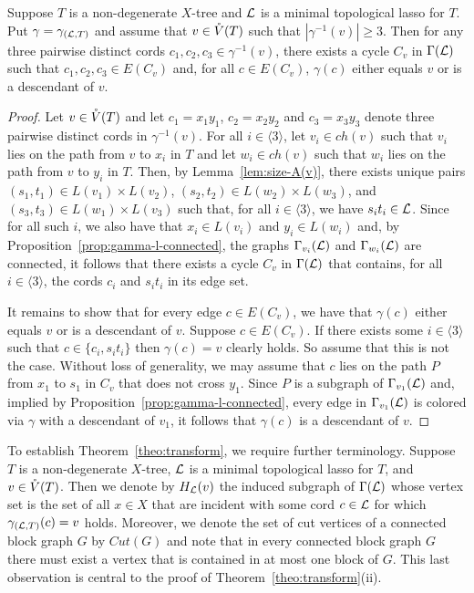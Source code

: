 \begin{lem}
  \label{lem:3-edges-cycle}
  Suppose $T$ is a non-degenerate $X$-tree and ${\mathcal L}$ is a minimal topological
  lasso for $T$.  Put $\gamma=\gamma_{({\mathcal L},T)}$ and assume that $v\in \mathring{V}(T)$
  such that $|\gamma^{-1}(v)|\geq 3 $. Then for any three pairwise distinct
  cords $c_1,c_2,c_3\in \gamma^{-1}(v)$, there exists a
  cycle $C_v$ in $\Gamma({\mathcal L})$ such that $c_1,c_2,c_3\in E(C_v)$ and, for all
  $c\in E(C_v)$, $\gamma(c)$ either equals $v$ or is a descendant of $v$.
\end{lem}
\begin{proof}
  Let $v\in \mathring{V}(T)$ and let $c_1=x_1y_1$, $c_2=x_2y_2$ and $c_3=x_3y_3$ denote
  three pairwise distinct cords in $\gamma^{-1}(v)$.  For all $i\in\langle
  3\rangle$, let $v_i\in ch(v) $ such that $v_i$ lies on the path from $v$ to
  $x_i$ in $T$ and let $w_i\in ch(v)$ such that $w_i$ lies on the path from
  $v$ to $y_i$ in $T$.  Then, by Lemma~\ref{lem:size-A(v)}, there exists
  unique pairs $(s_1,t_1)\in L(v_1)\times L(v_2)$, $(s_2,t_2)\in L(w_2)\times
  L(w_3)$, and $(s_3,t_3)\in L(w_1)\times L(v_3)$ such that, for all
  $i\in\langle 3\rangle$, we have $s_it_i\in {\mathcal L}$.  Since for all such $i$, we
  also have that $x_i\in L(v_i)$ and $y_i\in L(w_i)$ and, by
  Proposition~\ref{prop:gamma-l-connected}, the graphs $\Gamma_{v_i}({\mathcal L})$ and
  $\Gamma_{w_i}({\mathcal L})$ are connected, it follows that there exists a
  cycle $C_v$ in $\Gamma({\mathcal L})$ that contains, for all $i\in\langle 3\rangle$,
  the cords $c_i$ and $s_it_i$ in its edge set.

  It remains to show that for every edge $c\in E(C_v)$, we have that
  $\gamma(c)$ either equals $v$ or is a descendant of $v$.  Suppose $c\in
  E(C_v)$.  If there exists some $i\in\langle 3\rangle$ such that
  $c\in\{c_i,s_it_i\}$ then $\gamma (c)=v$ clearly holds. So assume that
  this is not the case. Without loss of generality, we may assume that $c$
  lies on the path $P$ from $x_1$ to $s_1$ in $C_v$ that does not cross
  $y_1$. Since $P$ is a subgraph of $\Gamma_{v_1}({\mathcal L})$ and, implied by
  Proposition~\ref{prop:gamma-l-connected}, every edge in $\Gamma_{v_1}({\mathcal L})$
  is colored via $\gamma$ with a descendant of $v_1$, it follows that
  $\gamma(c)$ is a descendant of $v$.
\end{proof}

To establish Theorem~\ref{theo:transform}, we require further terminology.
Suppose $T$ is a non-degenerate $X$-tree, ${\mathcal L}$ is a minimal topological lasso
for $T$, and $v\in \mathring{V}(T)$.  Then we denote by $H_{{\mathcal L}}(v)$ the induced
subgraph of $\Gamma({\mathcal L})$ whose vertex set is the set of all $x\in X$ that are
incident with some cord $c\in {\mathcal L}$ for which $\gamma_{({\mathcal L},T)}(c)=v$ holds.
Moreover, we denote the set of cut vertices of a connected block graph $G$ by
$Cut(G)$ and note that in every connected block graph $G$ there must exist a
vertex that is contained in at most one block of $G$. This last observation is
central to the proof of Theorem~\ref{theo:transform}(ii).

